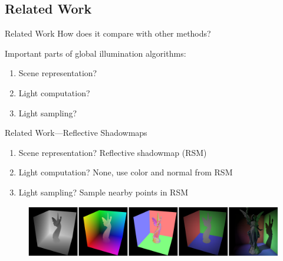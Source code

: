 \documentclass[10pt]{beamer}
\begin{document}
\subsection{Related Work}
\begin{frame}{Related Work}
  How does it compare with other methods?
  \vspace{1cm}

  Important parts of global illumination algorithms:
  \begin{enumerate}
    \item Scene representation? %
    \item Light computation? %
    \item Light sampling? %
  \end{enumerate}
\end{frame}

{
\begin{frame}{Related Work---Reflective Shadowmaps}
  \begin{enumerate}
    \item Scene representation? \alert{Reflective shadowmap (RSM)}%
    \item Light computation? \alert{None, use color and normal from RSM}%
    \item Light sampling? \alert{Sample nearby points in RSM} %
  \end{enumerate}

  \begin{figure}
    \includegraphics[width=\textwidth]{rsm}
  \end{figure}

\end{frame}}
\end{document}
